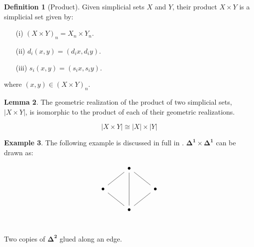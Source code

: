 \documentclass[10pt]{amsart}
\newcommand{\8}{\ensuremath{\infty}}
\newcommand{\0}{\ensuremath{\overset{\rightarrow}{0}}}
\newcommand{\1}{\ensuremath{\mathbf{1}}}
\newcommand{\Simplex}[1]{\ensuremath{\boldsymbol{\Delta^{#1}}}}
\theoremstyle{definition}
\newtheorem{definition}{Definition}[section]
\newtheorem{lemma}[definition]{Lemma}
\newtheorem{example}[definition]{Example}
\numberwithin{definition}{subsection}
\numberwithin{definition}{section}
\begin{document}
\begin{definition}[Product\label{def:prodsset}]
  Given simplicial sets $X$ and $Y$, their product $X \times Y$ is a simplicial set given by:

  \begin{enumerate}
    \item[(i)] $(X \times Y)_n = X_n \times Y_n$.
    \item[(ii)] $d_i(x, y) = (d_i x, d_i y)$.
    \item[(iii)] $s_i(x, y) = (s_i x, s_i y)$.
  \end{enumerate}

  where $(x, y) \in (X \times Y)_n$.
\end{definition}

\begin{lemma}
  The geometric realization of the product of two simplicial sets, $|X \times Y|$, is isomorphic to the product of each of their geometric realizations.

  \begin{equation*}
    |X \times Y| \cong |X| \times |Y|
  \end{equation*}
\end{lemma}

\begin{example}
  The following example is discussed in full in \cite{Friedman08}. $\Simplex{1} \times \Simplex{1}$ can be drawn as:

  \begin{equation*}
    \begin{tikzcd}
      & \bullet \arrow[dr, dash] \arrow[dd, dash] & \\
      \bullet \arrow[ur, dash] \arrow[dr, dash] & & \bullet \\
      & \bullet \arrow[ur, dash] & \\
    \end{tikzcd}
  \end{equation*}

  Two copies of $\Simplex{2}$ glued along an edge.
\end{example}
\end{document}
